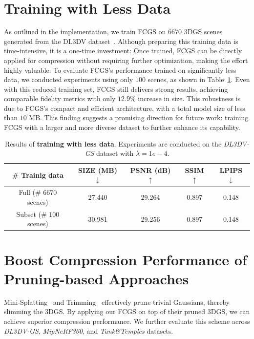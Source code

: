 \documentclass{article} %
\begin{document}
\section{Training with Less Data}


As outlined in the implementation, we train FCGS on $6670$ 3DGS scenes generated from the DL3DV dataset~\citep{DL3DV}. Although preparing this training data is time-intensive, it is a one-time investment: Once trained, FCGS can be directly applied for compression without requiring further optimization, making the effort highly valuable.
To evaluate FCGS’s performance trained on significantly less data, we conducted experiments using only $100$ scenes, as shown in Table~\ref{tab:train_with_fewer_data}. Even with this reduced training set, FCGS still delivers strong results, achieving comparable fidelity metrics with only $12.9\%$ increase in size. This robustness is due to FCGS’s compact and efficient architecture, with a total model size of less than $10$ MB.
This finding suggests a promising direction for future work: training FCGS with a larger and more diverse dataset to further enhance its capability.

\begin{table}[H]
    \centering
    \caption{Results of \textbf{training with less data}. Experiments are conducted on the \textit{DL3DV-GS} dataset with $\lambda=1e-4$.}
    \vspace{5pt}
    \renewcommand{\arraystretch}{1.20}
    \setlength{\tabcolsep}{8pt}  
    \begin{tabular}{c|c|ccc}
        \toprule[2pt]
        \# Trainig data & SIZE (MB) $\downarrow$   & PSNR (dB) $\uparrow$ & SSIM $\uparrow$ & LPIPS $\downarrow$ \\  \bottomrule
        Full (\# $6670$ scenes) & 27.440 & 29.264 & 0.897 & 0.148 \\
        Subset (\# $100$ scenes) & 30.981 & 29.256 & 0.897 & 0.148 \\ \bottomrule[2pt]
    \end{tabular}
    \label{tab:train_with_fewer_data}
\end{table}
\clearpage

\section{Boost Compression Performance of Pruning-based Approaches}
\label{sec:additional_exp_boost}
Mini-Splatting~\citep{mini} and Trimming~\citep{Trimming} effectively prune trivial Gaussians, thereby slimming the 3DGS. By applying our FCGS on top of their pruned 3DGS, we can achieve superior compression performance. We further evaluate this scheme across \textit{DL3DV-GS}, \textit{MipNeRF360}, and \textit{Tank\&Temples} datasets.
\end{document}
